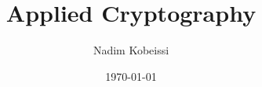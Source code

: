 \documentclass[aspectratio=169, lualatex, handout]{beamer}
\title{Applied Cryptography}
\author{Nadim Kobeissi}
\institute{American University of Beirut}
\date{\today}
\begin{document}
\begin{frame}[plain]
	\titlepage
\end{frame}

%

\incompleteslideswarning

\begin{frame}[plain]
	\titlepage
\end{frame}
\end{document}
